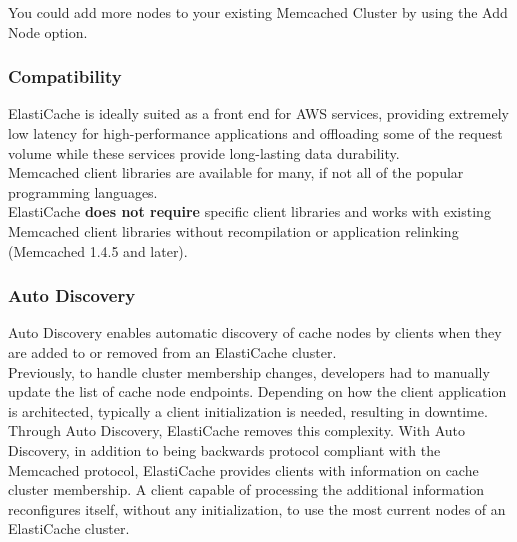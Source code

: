 \documentclass[12pt, letterpaper, twoside]{article}
\begin{document}
You could add more nodes to your existing Memcached Cluster by using the Add Node option.\\

\subsubsection{Compatibility}
ElastiCache is ideally suited as a front end for AWS services, providing extremely low latency for high-performance applications 
and offloading some of the request volume while these services provide long-lasting data durability.\\
Memcached client libraries are available for many, if not all of the popular programming languages.\\

ElastiCache \textbf{does not require} specific client libraries and works with existing Memcached client libraries without 
recompilation or application relinking (Memcached 1.4.5 and later).\\

\subsubsection{Auto Discovery}
Auto Discovery enables automatic discovery of cache nodes by clients when they are added to or removed from an ElastiCache 
cluster.\\
Previously, to handle cluster membership changes, developers had to manually update the list of cache node endpoints. 
Depending on how the client application is architected, typically a client initialization is needed, resulting in downtime.\\
Through Auto Discovery, ElastiCache removes this complexity. With Auto Discovery, in addition to being backwards protocol 
compliant with the Memcached protocol, ElastiCache provides clients with information on cache cluster membership. A client 
capable of processing the additional information reconfigures itself, without any initialization, to use the most current 
nodes of an ElastiCache cluster.\\
\end{document}
